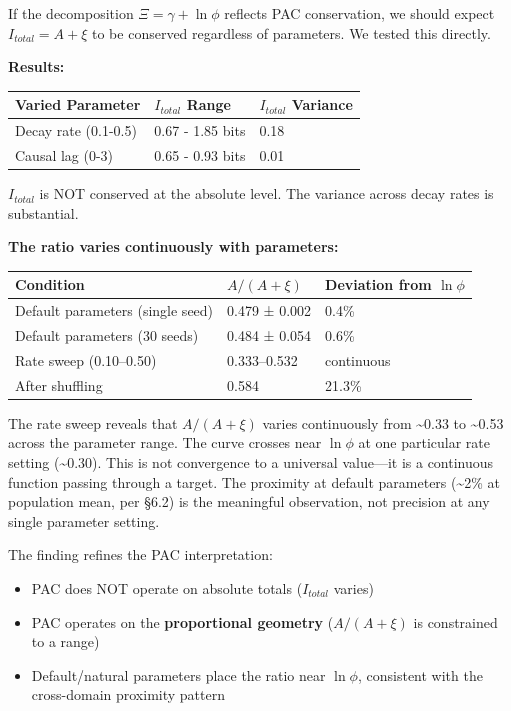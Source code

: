 \documentclass[
  11pt,
  a4paper]{article}
\providecommand{\tightlist}{%
  \setlength{\itemsep}{0pt}\setlength{\parskip}{0pt}}
\begin{document}
If the decomposition \(\Xi = \gamma + \ln\phi\) reflects PAC
conservation, we should expect \(I_{total} = A + \xi\) to be conserved
regardless of parameters. We tested this directly.

\textbf{Results:}

\begin{longtable}[]{@{}lll@{}}
\toprule\noalign{}
Varied Parameter & \(I_{total}\) Range & \(I_{total}\) Variance \\
\midrule\noalign{}
\endhead
\bottomrule\noalign{}
\endlastfoot
Decay rate (0.1-0.5) & 0.67 - 1.85 bits & 0.18 \\
Causal lag (0-3) & 0.65 - 0.93 bits & 0.01 \\
\end{longtable}

\(I_{total}\) is NOT conserved at the absolute level. The variance
across decay rates is substantial.

\textbf{The ratio varies continuously with parameters:}

\begin{longtable}[]{@{}lll@{}}
\toprule\noalign{}
Condition & \(A/(A+\xi)\) & Deviation from \(\ln\phi\) \\
\midrule\noalign{}
\endhead
\bottomrule\noalign{}
\endlastfoot
Default parameters (single seed) & 0.479 ± 0.002 & 0.4\% \\
Default parameters (30 seeds) & 0.484 ± 0.054 & 0.6\% \\
Rate sweep (0.10--0.50) & 0.333--0.532 & continuous \\
After shuffling & 0.584 & 21.3\% \\
\end{longtable}

The rate sweep reveals that \(A/(A+\xi)\) varies continuously from
\textasciitilde0.33 to \textasciitilde0.53 across the parameter range.
The curve crosses near \(\ln\phi\) at one particular rate setting
(\textasciitilde0.30). This is not convergence to a universal value---it
is a continuous function passing through a target. The proximity at
default parameters (\textasciitilde2\% at population mean, per §6.2) is
the meaningful observation, not precision at any single parameter
setting.

The finding refines the PAC interpretation:

\begin{itemize}
\tightlist
\item
  PAC does NOT operate on absolute totals (\(I_{total}\) varies)
\item
  PAC operates on the \textbf{proportional geometry} (\(A/(A+\xi)\) is
  constrained to a range)
\item
  Default/natural parameters place the ratio near \(\ln\phi\),
  consistent with the cross-domain proximity pattern
\end{itemize}
\end{document}
